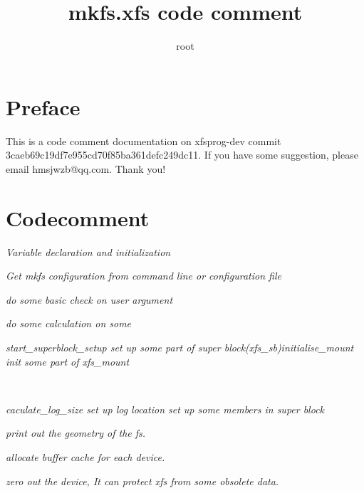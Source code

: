 \documentclass[]{article}
\title{%
\vspace{-30mm}\Huge
\textbf{mkfs.xfs code comment}\vspace{9mm}}
\author{root}
\begin{document}
\maketitle
\newpage
\section{Preface}
This is a code comment documentation on xfsprog-dev commit 3caeb69c19df7e955cd70f85ba361defc249dc11. \linebreak
If you have some suggestion, please email hmsjwzb@qq.com. Thank you!
\section{Codecomment}
\noindent {}%
\parbox[t]{120mm}{\sl Variable declaration and initialization}

\noindent {}%
\parbox[t]{120mm}{\sl Get mkfs configuration from command line or configuration file}

\noindent {}
\parbox[t]{120mm}{\sl do some basic check on user argument}

\noindent {}
\parbox[t]{120mm}{\sl do some calculation on some}

\noindent {}
\parbox[t]{120mm}{\sl start\_superblock\_setup set up some part of super block(xfs\_sb)\newline initialise\_mount init some part of xfs\_mount}\\

\noindent {}
\parbox[t]{120mm}{\sl{\boldmath caculate\_log\_size} set up log location set up some members in super block}

\noindent {}
\parbox[t]{120mm}{\sl print out the geometry of the fs.}

\noindent {}
\parbox[t]{120mm}{\sl allocate buffer cache for each device.}

\noindent {}
\parbox[t]{120mm}{\sl zero out the device, It can protect xfs from some obsolete data.}
\end{document}
